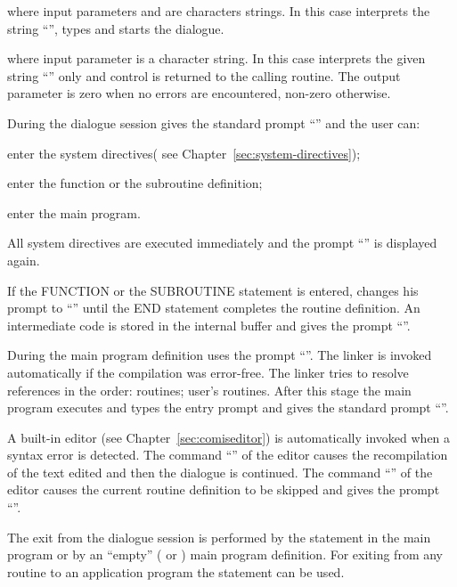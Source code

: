  
where input parameters  and  are
characters strings. 
In this case
\COMIS{} interprets the string ``'', 
types  and starts the dialogue.

 
where input parameter  is a character string. In this case
\COMIS{} interprets the given string ``'' only and control is returned
to the calling routine. 
The output parameter  is zero when no errors 
are encountered, non-zero otherwise.
 
During the dialogue session \COMIS{} gives the standard prompt ``''
and the user can:
\begin{UL}
\item enter the system directives( see Chapter~\ref{sec:system-directives});
\item enter the function or the subroutine definition;
\item enter the \COMIS{} main program.
\end{UL}
 
All system directives are executed immediately and
the prompt ``'' is displayed again.
 
If the FUNCTION or the SUBROUTINE statement is entered, \COMIS{} changes
his prompt to ``'' until the END statement completes the routine
definition. An intermediate code is stored in the internal buffer
and \COMIS{} gives the prompt ``''.
 
During the main program definition \COMIS{} uses the prompt ``''.
The \COMIS{} linker is invoked automatically if the compilation
was error-free. The linker tries to resolve references in the
order: \COMIS{} routines; user's routines.
After this stage the main program executes
and \COMIS{} types the entry prompt
and gives the standard prompt ``''.
 
A \COMIS{} built-in editor (see Chapter~\ref{sec:comiseditor}) is automatically
invoked when a syntax
error is detected. The command ``'' of the editor causes
the recompilation of the text edited and then the dialogue
is continued. The command ``'' of the editor causes the current
routine definition to be skipped and \COMIS{} gives the prompt ``''.
 
The exit from the \COMIS{} dialogue session is performed
by the  statement
in the main program or by an ``empty'' ( or \Lit{#} )
main program definition.
For exiting from any \COMIS{} routine to an application program
the  statement can be used.


